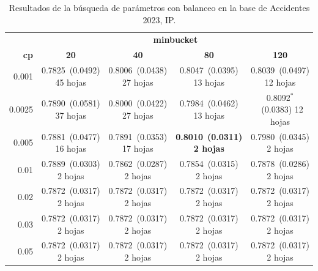 \documentclass[twoside,a4paper,12pt,onecolumn,openany]{book}
\begin{document}
\begin{table}[H]
\centering
\small
\setlength{\tabcolsep}{4pt}
\begin{tabular}{r|cccc}
\toprule
 & \multicolumn{4}{c}{\textbf{minbucket}} \\
\cmidrule(lr){2-5}
\textbf{cp} & \textbf{20} & \textbf{40} & \textbf{80} & \textbf{120} \\
\midrule
0.001 & \shortstack{0.7825~(0.0492)\\ 45 hojas} & \shortstack{0.8006~(0.0438)\\ 27 hojas} & \shortstack{0.8047~(0.0395)\\ 13 hojas} & \shortstack{0.8039~(0.0497)\\ 12 hojas} \\[4pt]
0.0025 & \shortstack{0.7890~(0.0581)\\ 37 hojas} & \shortstack{0.8000~(0.0422)\\ 27 hojas} & \shortstack{0.7984~(0.0462)\\ 13 hojas} & \shortstack{0.8092$^{*}$~(0.0383)\\ 12 hojas} \\[4pt]
0.005 & \shortstack{0.7881~(0.0477)\\ 16 hojas} & \shortstack{0.7891~(0.0353)\\ 17 hojas} & \shortstack{\textbf{0.8010}~\textbf{(0.0311)}\\ \textbf{2 hojas}} & \shortstack{0.7980~(0.0345)\\ 2 hojas} \\[4pt]
0.01 & \shortstack{0.7889~(0.0303)\\ 2 hojas} & \shortstack{0.7862~(0.0287)\\ 2 hojas} & \shortstack{0.7854~(0.0315)\\ 2 hojas} & \shortstack{0.7878~(0.0286)\\ 2 hojas} \\[4pt]
0.02 & \shortstack{0.7872~(0.0317)\\ 2 hojas} & \shortstack{0.7872~(0.0317)\\ 2 hojas} & \shortstack{0.7872~(0.0317)\\ 2 hojas} & \shortstack{0.7872~(0.0317)\\ 2 hojas} \\[4pt]
0.03 & \shortstack{0.7872~(0.0317)\\ 2 hojas} & \shortstack{0.7872~(0.0317)\\ 2 hojas} & \shortstack{0.7872~(0.0317)\\ 2 hojas} & \shortstack{0.7872~(0.0317)\\ 2 hojas} \\[4pt]
0.05 & \shortstack{0.7872~(0.0317)\\ 2 hojas} & \shortstack{0.7872~(0.0317)\\ 2 hojas} & \shortstack{0.7872~(0.0317)\\ 2 hojas} & \shortstack{0.7872~(0.0317)\\ 2 hojas} \\[4pt]
\bottomrule
\end{tabular}
\caption{Resultados de la búsqueda de parámetros con balanceo en la base de Accidentes 2023, IP.}
\label{tab:busqueda_acc_ip_2023}
\end{table}
 
\end{document}
